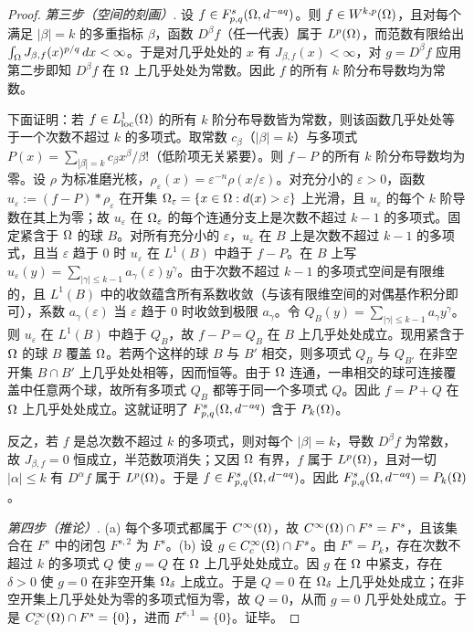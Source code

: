 \begin{proof}
\emph{第三步（空间的刻画）}. 设 $f\in F^{s}_{p,q}(\Omega,d^{-aq})$。则 $f\in W^{k,p}(\Omega)$，且对每个满足 $|\beta|=k$ 的多重指标 $\beta$，函数 $D^\beta f$（任一代表）属于 $L^p(\Omega)$，而范数有限给出 $\int_\Omega J_{\beta,f}(x)^{p/q}\,dx<\infty$。于是对几乎处处的 $x$ 有 $J_{\beta,f}(x)<\infty$，对 $g=D^\beta f$ 应用第二步即知 $D^\beta f$ 在 $\Omega$ 上几乎处处为常数。因此 $f$ 的所有 $k$ 阶分布导数均为常数。

下面证明：若 $f\in L^1_{\mathrm{loc}}(\Omega)$ 的所有 $k$ 阶分布导数皆为常数，则该函数几乎处处等于一个次数不超过 $k$ 的多项式。取常数 $c_\beta$（$|\beta|=k$）与多项式 $P(x)=\sum_{|\beta|=k}c_\beta x^\beta/\beta!$（低阶项无关紧要）。则 $f-P$ 的所有 $k$ 阶分布导数均为零。设 $\rho$ 为标准磨光核，$\rho_\varepsilon(x)=\varepsilon^{-n}\rho(x/\varepsilon)$。对充分小的 $\varepsilon>0$，函数 $u_\varepsilon:=(f-P)*\rho_\varepsilon$ 在开集 $\Omega_\varepsilon=\{x\in\Omega : d(x)>\varepsilon\}$ 上光滑，且 $u_\varepsilon$ 的每个 $k$ 阶导数在其上为零；故 $u_\varepsilon$ 在 $\Omega_\varepsilon$ 的每个连通分支上是次数不超过 $k-1$ 的多项式。固定紧含于 $\Omega$ 的球 $B$。对所有充分小的 $\varepsilon$，$u_\varepsilon$ 在 $B$ 上是次数不超过 $k-1$ 的多项式，且当 $\varepsilon$ 趋于 $0$ 时 $u_\varepsilon$ 在 $L^1(B)$ 中趋于 $f-P$。在 $B$ 上写 $u_\varepsilon(y)=\sum_{|\gamma|\le k-1}a_\gamma(\varepsilon)y^\gamma$。由于次数不超过 $k-1$ 的多项式空间是有限维的，且 $L^1(B)$ 中的收敛蕴含所有系数收敛（与该有限维空间的对偶基作积分即可），系数 $a_\gamma(\varepsilon)$ 当 $\varepsilon$ 趋于 $0$ 时收敛到极限 $a_\gamma$。令 $Q_B(y)=\sum_{|\gamma|\le k-1}a_\gamma y^\gamma$。则 $u_\varepsilon$ 在 $L^1(B)$ 中趋于 $Q_B$，故 $f-P=Q_B$ 在 $B$ 上几乎处处成立。现用紧含于 $\Omega$ 的球 $B$ 覆盖 $\Omega$。若两个这样的球 $B$ 与 $B'$ 相交，则多项式 $Q_B$ 与 $Q_{B'}$ 在非空开集 $B\cap B'$ 上几乎处处相等，因而恒等。由于 $\Omega$ 连通，一串相交的球可连接覆盖中任意两个球，故所有多项式 $Q_B$ 都等于同一个多项式 $Q$。因此 $f=P+Q$ 在 $\Omega$ 上几乎处处成立。这就证明了 $F^{s}_{p,q}(\Omega,d^{-aq})$ 含于 $P_k(\Omega)$。

反之，若 $f$ 是总次数不超过 $k$ 的多项式，则对每个 $|\beta|=k$，导数 $D^\beta f$ 为常数，故 $J_{\beta,f}=0$ 恒成立，半范数项消失；又因 $\Omega$ 有界，$f$ 属于 $L^p(\Omega)$，且对一切 $|\alpha|\le k$ 有 $D^\alpha f$ 属于 $L^p(\Omega)$。于是 $f\in F^{s}_{p,q}(\Omega,d^{-aq})$。因此 $F^{s}_{p,q}(\Omega,d^{-aq})=P_k(\Omega)$。

\emph{第四步（推论）}. (a) 每个多项式都属于 $C^\infty(\Omega)$，故 $C^\infty(\Omega)\cap F^s=F^s$，且该集合在 $F^s$ 中的闭包 $F^{s,2}$ 为 $F^s$。(b) 设 $g\in C_c^\infty(\Omega)\cap F^s$。由 $F^s=P_k$，存在次数不超过 $k$ 的多项式 $Q$ 使 $g=Q$ 在 $\Omega$ 上几乎处处成立。因 $g$ 在 $\Omega$ 中紧支，存在 $\delta>0$ 使 $g=0$ 在非空开集 $\Omega_\delta$ 上成立。于是 $Q=0$ 在 $\Omega_\delta$ 上几乎处处成立；在非空开集上几乎处处为零的多项式恒为零，故 $Q=0$，从而 $g=0$ 几乎处处成立。于是 $C_c^\infty(\Omega)\cap F^s=\{0\}$，进而 $F^{s,1}=\{0\}$。证毕。
\end{proof}

